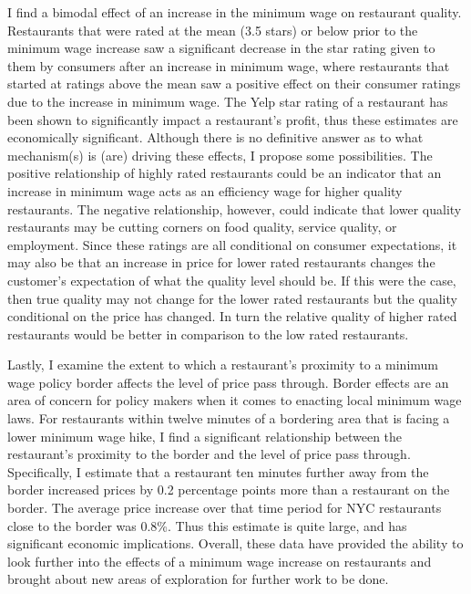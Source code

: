\documentclass[11pt]{article}
\begin{document}
 I find a bimodal effect of an increase in the minimum wage on restaurant quality. Restaurants that were rated at the mean (3.5 stars) or below  prior to the minimum wage increase saw a significant decrease in the star rating given to them by consumers after an increase in minimum wage, where restaurants that started at ratings above the mean saw a positive effect on their consumer ratings due to the increase in minimum wage. The Yelp star rating of a restaurant has been shown to significantly impact a restaurant's profit, thus these estimates are economically significant. Although there is no definitive answer as to what mechanism(s) is (are) driving these effects, I propose some possibilities. The positive relationship of highly rated restaurants could be an indicator that an increase in minimum wage acts as an efficiency wage for higher quality restaurants. The negative relationship, however, could indicate that lower quality restaurants may be cutting corners on food quality, service quality, or employment. Since these ratings are all conditional on consumer expectations, it may also be that an increase in price for lower rated restaurants changes the customer's expectation of what the quality level should be. If this were the case, then true quality may not change for the lower rated restaurants but the quality conditional on the price has changed. In turn the relative quality of higher rated restaurants would be better in comparison to the low rated restaurants. 

Lastly, I examine the extent to which a restaurant's proximity to a minimum wage policy border affects the level of price pass through. Border effects are an area of concern for policy makers when it comes to enacting local minimum wage laws. For restaurants within twelve minutes of a bordering area that is facing a lower minimum wage hike, I find a significant relationship between the restaurant's proximity to the border and the level of price pass through. Specifically, I estimate that a restaurant ten minutes further away from the border increased prices by 0.2 percentage points more than a restaurant on the border. The average price increase over that time period for NYC restaurants close to the border was 0.8\%. Thus this estimate is quite large, and has significant economic implications. Overall, these data have provided the ability to look further into the effects of a minimum wage increase on restaurants and brought about new areas of exploration for further work to be done.
\end{document}
